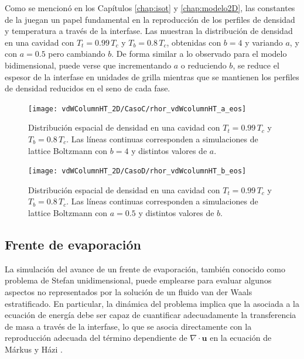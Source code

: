 Como se mencion\'o en los Cap\'itulos \ref{chap:isot} y \ref{chap:modelo2D}, las constantes de la \eos{} juegan un papel fundamental en la reproducci\'on de los perfiles de densidad y temperatura a trav\'es de la interfase. Las  muestran la distribuci\'on de densidad en una cavidad con $T_t = 0.99 \, T_c$ y $T_b = 0.8 \, T_c$, obtenidas con $b=4$ y variando $a$, y con $a=0.5$ pero cambiando $b$. De forma similar a lo observado para el modelo bidimensional, puede verse que incrementando $a$ o reduciendo $b$, se reduce el espesor de la interfase en unidades de grilla mientras que se mantienen los perfiles de densidad reducidos en el seno de cada fase.

\begin{figure}[ht]
	\centering
	\texttt{[image: vdWColumnHT\_2D/CasoC/rhor\_vdWcolumnHT\_a\_eos]}
	\caption{Distribuci\'on espacial de densidad en una cavidad con $T_t = 0.99 \, T_c$ y $T_b = 0.8 \, T_c$. Las l\'ineas continuas corresponden a simulaciones de lattice Boltzmann con $b=4$ y distintos valores de $a$.}
	\label{fig:vdWColumnHT_rhor_a_eos_3D}
\end{figure}
\FloatBarrier

\begin{figure}[ht]
	\centering
	\texttt{[image: vdWColumnHT\_2D/CasoD/rhor\_vdWcolumnHT\_b\_eos]}
	\caption{Distribuci\'on espacial de densidad en una cavidad con $T_t = 0.99 \, T_c$ y $T_b = 0.8 \, T_c$. Las l\'ineas continuas corresponden a simulaciones de lattice Boltzmann con $a=0.5$ y distintos valores de $b$.}
	\label{fig:vdWColumnHT_rhor_b_eos_3D}
\end{figure}
\FloatBarrier




\subsection{Frente de evaporaci\'on}

La simulaci\'on del avance de un frente de evaporaci\'on, tambi\'en conocido como problema de Stefan unidimensional, puede emplearse para evaluar algunos aspectos no representados por la soluci\'on de un fluido van der Waals estratificado. En particular, la din\'amica del problema implica que la \lbe{} asociada a la ecuaci\'on de energ\'ia debe ser capaz de cuantificar adecuadamente la transferencia de masa a trav\'es de la interfase, lo que se asocia directamente con la reproducci\'on adecuada del t\'ermino dependiente de $\nabla \cdot \bm{u}$ en la ecuaci\'on de M\'arkus y H\'azi \cite{safari_consistent_2014}.

